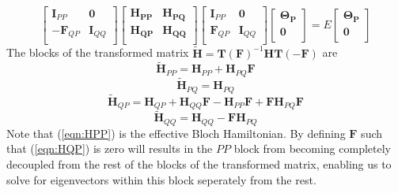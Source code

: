 \documentclass[12pt]{article}
\begin{document}
\begin{equation}
\begin{bmatrix}
\mathbf{I}_{PP} & \mathbf{0} \\ 
-\mathbf{F}_{QP} & \mathbf{I}_{QQ} \\ 
\end{bmatrix}
\begin{bmatrix}
 \mathbf{H_{PP}} & \mathbf{H_{PQ}} \\ 
 \mathbf{H_{QP}} & \mathbf{H_{QQ}} \\ 
\end{bmatrix} 
\begin{bmatrix}
\mathbf{I}_{PP} & \mathbf{0} \\ 
\mathbf{F}_{QP} & \mathbf{I}_{QQ} \\ 
\end{bmatrix}
\begin{bmatrix}
 \boldsymbol{\Theta_{P}} \\ 
 \mathbf{0}\\ 
\end{bmatrix} 
= E 
\begin{bmatrix}
 \boldsymbol{\Theta_{P}} \\ 
 \mathbf{0}\\ 
\end{bmatrix} 
\end{equation}
The blocks of the transformed matrix $\mathbf{\tilde{H}} = \mathbf{T}(\mathbf{F})^{-1} \mathbf{H} \mathbf{T}(-\mathbf{F})$ are
\begin{equation}
\mathbf{\tilde{H}}_{PP} = \mathbf{H}_{PP} + \mathbf{H}_{PQ}\mathbf{F}
\label{eqn:HPP}
\end{equation} 
\begin{equation}
\mathbf{\tilde{H}}_{PQ} = \mathbf{H}_{PQ}
\end{equation} 
\begin{equation}
\mathbf{\tilde{H}}_{QP} = \mathbf{H}_{QP} + \mathbf{H}_{QQ}\mathbf{F} - \mathbf{\mathbf{H}}_{PP}\mathbf{F} + \mathbf{F}\mathbf{H}_{PQ}\mathbf{F}
\label{eqn:HQP}
\end{equation} 
\begin{equation}
\mathbf{\tilde{H}}_{QQ} = \mathbf{H}_{QQ} -\mathbf{F}\mathbf{H}_{PQ}
\end{equation} 
Note that (\ref{eqn:HPP}) is the effective Bloch Hamiltonian.
By defining $\mathbf{F}$ such that (\ref{eqn:HQP}) is zero will results in the $PP$ block from becoming completely 
decoupled from the rest of the blocks of the transformed matrix, enabling us to solve for eigenvectors within this block
seperately from the rest.  
\end{document}
